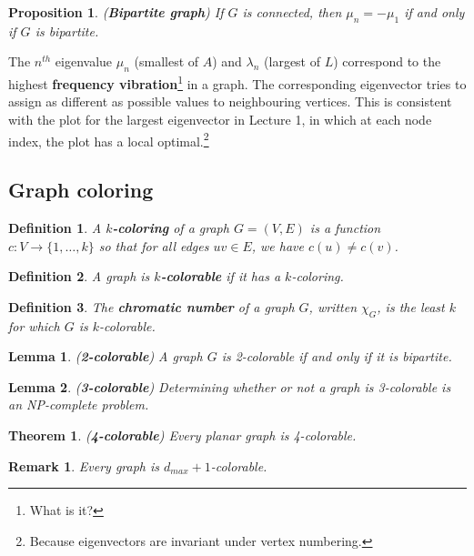 \documentclass[]{article}
\newtheorem{theorem}{Theorem}[section]
\newtheorem{lemma}{Lemma}[section]
\newtheorem{remark}{Remark}[section]
\newtheorem{definition}{Definition}[section] %
\newtheorem{proposition}{Proposition}[section] %
\begin{document}
	\begin{proposition} (\textbf{Bipartite graph})
		If $G$ is connected, then $\mu_n=-\mu_1$ if and only if $G$ is bipartite. 
	\end{proposition}
	
	The $n^{th}$ eigenvalue $\mu_n$ (smallest of $A$) and $\lambda_n$ (largest of $L$) correspond to the highest \textbf{frequency vibration}\footnote{What is it?} in a graph. The corresponding eigenvector tries to assign as different as possible values to neighbouring vertices. This is consistent with the plot for the largest eigenvector in Lecture 1, in which at each node index, the plot has a local optimal.\footnote{Because eigenvectors are invariant under vertex numbering.} 
	
	
	\subsection{Graph coloring}
	
	\begin{definition}
		A \textbf{$k$-coloring} of a graph $G=(V,E)$ is a function $c: V \rightarrow \{1, \dots, k\}$ so that for all edges $uv \in E$, we have $c(u) \neq c(v)$. 
	\end{definition}
	
	\begin{definition}
		A graph is \textbf{$k$-colorable} if it has a $k$-coloring. 
	\end{definition}
	
	\begin{definition}
		The \textbf{chromatic number} of a graph $G$, written $\chi_G$, is the least $k$ for which $G$ is $k$-colorable. 
	\end{definition}
	
	\begin{lemma} (\textbf{2-colorable})
		A graph $G$ is 2-colorable if and only if it is bipartite. 
	\end{lemma}
	
	\begin{lemma} (\textbf{3-colorable})
		Determining whether or not a graph is 3-colorable is an NP-complete problem. 
	\end{lemma}
	
	\begin{theorem} (\textbf{4-colorable})
		Every planar graph is 4-colorable. 
	\end{theorem}
	
	\begin{remark}
		Every graph is $d_{max}+1$-colorable.
	\end{remark}
	
\end{document}
